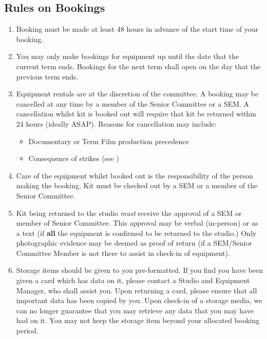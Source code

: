 \documentclass[]{article}
\begin{document}
\subsection{Rules on Bookings}
\begin{enumerate}
    \item Booking must be made at least 48 hours in advance of the start time of your booking.
    \item You may only make bookings for equipment up until the date that the current term ends. Bookings for the next term shall open on the day that the previous term ends.
    \item Equipment rentals are at the discretion of the committee. A booking may be cancelled at any time by a member of the Senior Committee or a SEM. A cancellation whilst kit is booked out will require that kit be returned within 24 hours (ideally ASAP). Reasons for cancellation may include:
          \begin{itemize}
              \item Documentary or Term Film production precedence
              \item Consequence of strikes (see )
          \end{itemize}
    \item Care of the equipment whilst booked out is the responsibility of the person making the booking. Kit must be checked out by a SEM or a member of the Senior Committee.
    \item Kit being returned to the studio \textit{must} receive the approval of a SEM or member of Senior Committee. This approval may be verbal (in-person) or as a text (if \textbf{all} the equipment is confirmed to be returned to the studio.) Only photographic evidence may be deemed as proof of return (if a SEM/Senior Committee Member is not there to assist in check-in of equipment).
    \item Storage items should be given to you pre-formatted. If you find you have been given a card which has data on it, please contact a Studio and Equipment Manager, who shall assist you. Upon returning a card, please ensure that all important data has been copied by you. Upon check-in of a storage media, we can no longer guarantee that you may retrieve any data that you may have had on it. You may not keep the storage item beyond your allocated booking period.
\end{enumerate}
\end{document}
